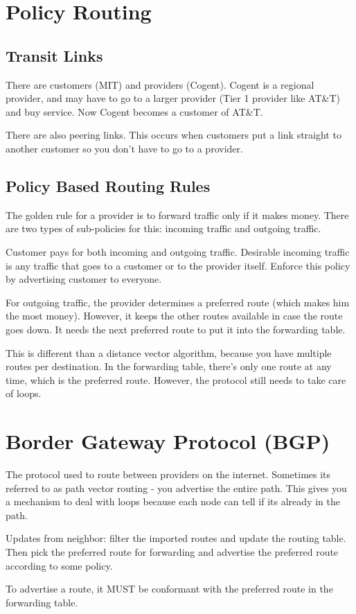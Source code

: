 \documentclass[psamsfonts]{amsart}
\begin{document}
\section{Policy Routing}

\subsection{Transit Links}

There are customers (MIT) and providers (Cogent). Cogent is a regional provider, and may have to go to a larger provider (Tier 1 provider like AT\&T) and buy service. Now Cogent becomes a customer of AT\&T.

There are also peering links. This occurs when customers put a link straight to another customer so you don't have to go to a provider. 

\subsection{Policy Based Routing Rules}

The golden rule for a provider is to forward traffic only if it makes money. There are two types of sub-policies for this: incoming traffic and outgoing traffic.

Customer pays for both incoming and outgoing traffic. Desirable incoming traffic is any traffic that goes to a customer or to the provider itself. Enforce this policy by advertising customer to everyone.

For outgoing traffic, the provider determines a preferred route (which makes him the most money). However, it keeps the other routes available in case the route goes down. It needs the next preferred route to put it into the forwarding table.

This is different than a distance vector algorithm, because you have multiple routes per destination. In the forwarding table, there's only one route at any time, which is the preferred route. However, the protocol still needs to take care of loops.

\section{Border Gateway Protocol (BGP)}

The protocol used to route between providers on the internet. Sometimes its referred to as path vector routing - you advertise the entire path. This gives you a mechanism to deal with loops because each node can tell if its already in the path.

Updates from neighbor: filter the imported routes and update the routing table. Then pick the preferred route for forwarding and advertise the preferred route according to some policy.

To advertise a route, it MUST be conformant with the preferred route in the forwarding table.
\end{document}
